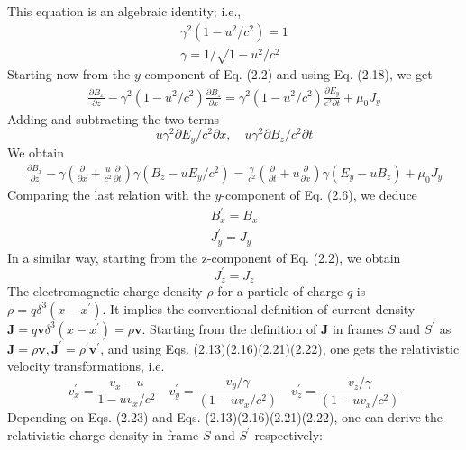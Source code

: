  This equation is an algebraic identity; i.e., 
\begin{align}
\gamma^{2}\left(1-u^{2} / c^{2}\right)=1\\
\gamma=1 / \sqrt{1-u^{2} / c^{2}}
\end{align}
Starting now from the $y$-component of Eq. (2.2) and using Eq. (2.18), we get
\begin{align*}
\frac{\partial B_{x}}{\partial z}-\gamma^{2}\left(1-u^{2} / c^{2}\right) \frac{\partial B_{z}}{\partial x}=\gamma^{2}\left(1-u^{2} / c^{2}\right) \frac{\partial E_{y}}{c^{2} \partial t}+\mu_{0} J_{y}
\end{align*}
Adding and subtracting the two terms
$$
u \gamma^{2} \partial E_{y} / c^{2} \partial x, \quad u \gamma^{2} \partial B_{z} / c^{2} \partial t
$$
We obtain
\begin{align*}
\frac{\partial B_{x}}{\partial z}-\gamma\left(\frac{\partial}{\partial x}+\frac{u}{c^{2}} \frac{\partial}{\partial t}\right) \gamma \left(B_{z}-u E_{y} / c^{2}\right) 
=\frac{\gamma}{c^{2}}\left(\frac{\partial}{\partial t}+u \frac{\partial}{\partial x}\right) \gamma\left(E_{y}-u B_{z}\right)+\mu_{0} J_{y}
\end{align*}
Comparing the last relation with the $y$-component of Eq. (2.6), we deduce
\begin{align}
B_{x}^{\prime}=B_{x}\\
J_{y}^{\prime}=J_{y}
\end{align}
In a similar way, starting from the z-component of Eq. (2.2), we obtain
\begin{equation}
J_{z}^{\prime}=J_{z}
\end{equation}
The electromagnetic charge density $\rho$ for a particle of charge $q$ is $\rho=q \delta^{3}\left(x-x^{\prime}\right)$. It implies the conventional definition of current density $\mathbf{J}=q \mathbf{v} \delta^{3}\left(x-x^{\prime}\right)=\rho \mathbf{v}$. Starting from the definition of $\mathbf{J}$ in frames $S$ and $S^{\prime}$ as $\mathbf{J}=\rho \mathbf{v}, \mathbf{J}^{\prime}=\rho^{\prime} \mathbf{v}^{\prime}$, and using Eqs. (2.13)(2.16)(2.21)(2.22), one gets the relativistic velocity transformations, i.e.
\begin{equation}
v_{x}^{\prime}=\frac{v_{x}-u}{1-u v_{x} / c^{2}} \quad  v_{y}^{\prime}=\frac{v_{y} / \gamma}{\left(1-u v_{x} / c^{2}\right)} \quad v_{z}^{\prime}=\frac{v_{z} / \gamma}{\left(1-u v_{x} / c^{2}\right)}
\end{equation}
 Depending on Eqs. (2.23) and Eqs. (2.13)(2.16)(2.21)(2.22), one can derive the relativistic charge density in frame $S$ and $S^{\prime}$ respectively:
